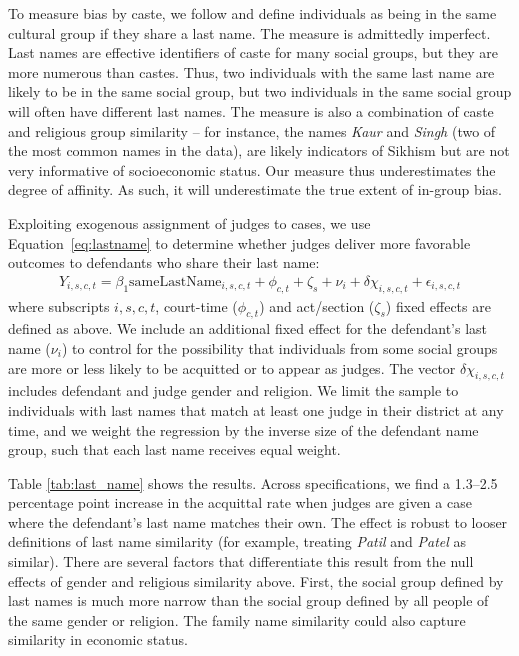 \documentclass[12pt,english]{article}
\begin{document}
To measure bias by caste, we follow \citet{fisman2017cultural} and define individuals as being in the same cultural group if they share a last name. The measure is admittedly imperfect. Last names are effective identifiers of caste for many social groups, but they are more numerous than castes. Thus, two individuals with the same last name are likely to be in the same social group, but two individuals in the same social group will often have different last names. The measure is also a combination of caste and religious group similarity -- for instance, the names \textit{Kaur} and \textit{Singh} (two of the most common names in the data), are likely indicators of Sikhism but are not very informative of socioeconomic status. Our measure thus underestimates the degree of affinity. As such, it will underestimate the true extent of in-group bias.

Exploiting exogenous assignment of judges to cases, we use Equation~\ref{eq:lastname} to determine whether judges deliver more favorable outcomes to defendants who share their last name: 
\begin{equation}
  \label{eq:lastname}
  \begin{split}
    Y_{i,s,c,t} = \beta_{1} \text{sameLastName}_{i,s,c,t} +  \phi_{c,t} + \zeta_{s} + \nu_{i}  + \delta \chi_{i,s,c,t} + \epsilon_{i,s,c,t}
  \end{split}
\end{equation}
where subscripts $i,s,c,t$, court-time ($\phi_{c,t}$) and act/section ($\zeta_s$) fixed effects are defined as above. We include an additional fixed effect for the defendant's last name ($\nu_i$) to control for the possibility that individuals from some social groups are more or less likely to be acquitted or to appear as judges. The vector $\delta \chi_{i,s,c,t}$ includes defendant and judge gender and religion. We limit the sample to individuals with last names that match at least one judge in their district at any time, and we weight the regression by the inverse size of the defendant name group, such that each last name receives equal weight.

Table \ref{tab:last_name} shows the results. Across specifications, we find a 1.3--2.5 percentage point increase in the acquittal rate when judges are given a case where the defendant's last name matches their own. The effect is robust to looser definitions of last name similarity (for example, treating \textit{Patil} and \textit{Patel} as similar). There are several factors that differentiate this result from the null effects of gender and religious similarity above. First, the social group defined by last names is much more narrow than the social group defined by all people of the same gender or religion. The family name similarity could also capture similarity in economic status.
\end{document}
